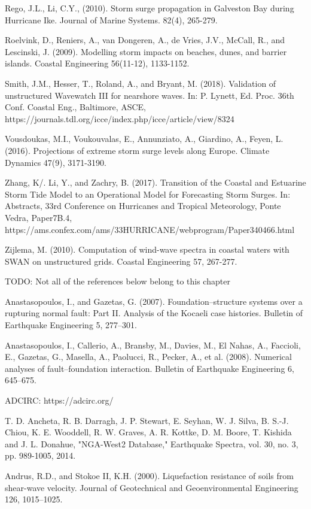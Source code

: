 Rego, J.L., Li, C.Y., (2010). Storm surge propagation in Galveston Bay during Hurricane Ike. Journal of Marine Systems. 82(4), 265-279.

Roelvink, D., Reniers, A., van Dongeren, A., de Vries, J.V., McCall, R., and Lescinski, J. (2009). Modelling storm impacts on beaches, dunes, and barrier islands. Coastal Engineering 56(11-12), 1133-1152.

Smith, J.M., Hesser, T., Roland, A., and Bryant, M. (2018). Validation of unstructured Wavewatch III for nearshore waves. In: P. Lynett, Ed. Proc. 36th Conf. Coastal Eng., Baltimore, ASCE, https://journals.tdl.org/icce/index.php/icce/article/view/8324 

Vousdoukas, M.I., Voukouvalas, E., Annunziato, A., Giardino, A., Feyen, L. (2016). Projections of extreme storm surge levels along Europe. Climate Dynamics 47(9), 3171-3190.

Zhang, K/. Li, Y., and Zachry, B. (2017). Transition of the Coastal and Estuarine Storm Tide Model to an Operational Model for Forecasting Storm Surges. In: Abstracts, 33rd Conference on Hurricanes and Tropical Meteorology, Ponte Vedra, Paper7B.4, https://ams.confex.com/ams/33HURRICANE/webprogram/Paper340466.html 

Zijlema, M. (2010). Computation of wind-wave spectra in coastal waters with SWAN on unstructured grids. Coastal Engineering 57, 267-277.

TODO: Not all of the references below belong to this chapter

Anastasopoulos, I., and Gazetas, G. (2007). Foundation–structure systems over a rupturing normal fault: Part II. Analysis of the Kocaeli case histories. Bulletin of Earthquake Engineering 5, 277–301.

Anastasopoulos, I., Callerio, A., Bransby, M., Davies, M., El Nahas, A., Faccioli, E., Gazetas, G., Masella, A., Paolucci, R., Pecker, A., et al. (2008). Numerical analyses of fault–foundation interaction. Bulletin of Earthquake Engineering 6, 645–675.

ADCIRC: https://adcirc.org/

T. D. Ancheta, R. B. Darragh, J. P. Stewart, E. Seyhan, W. J. Silva, B. S.-J. Chiou, K. E. Wooddell, R. W. Graves, A. R. Kottke, D. M. Boore, T. Kishida and J. L. Donahue, "NGA-West2 Database," Earthquake Spectra, vol. 30, no. 3, pp. 989-1005, 2014.

Andrus, R.D., and Stokoe II, K.H. (2000). Liquefaction resistance of soils from shear-wave velocity. Journal of Geotechnical and Geoenvironmental Engineering 126, 1015–1025.

